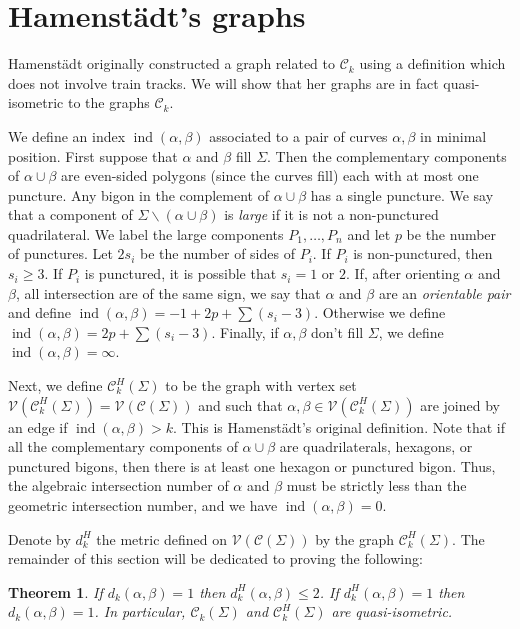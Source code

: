 \documentclass[11pt]{article}
\newtheorem{thm}{Theorem}[section]
\theoremstyle{remark}
\def\C{{\mathcal C}}
\def\ind{\operatorname{ind}}
\begin{document}
\section{Hamenst\"{a}dt's graphs}\label{sec:3}
Hamenst\"{a}dt originally constructed a graph related to $\C_k$ using a definition
which does not involve train tracks. We will show that her graphs are in fact
quasi-isometric to the graphs $\C_k$.

We define an index $\ind(\alpha,\beta)$ associated to a pair of curves $\alpha,\beta$
in minimal position.
First suppose that $\alpha$ and $\beta$ fill $\Sigma$. Then the complementary components of $\alpha\cup \beta$ are even-sided polygons (since the curves fill) each with at most one puncture.
Any bigon in the complement of $\alpha\cup\beta$ has a single puncture.
We say that a component of $\Sigma \smallsetminus (\alpha\cup\beta)$ is {\em large} if it is not a non-punctured quadrilateral.
 We label the large components $P_1, \dots, P_n$ and let $p$ be the number of punctures.
 Let $2s_i$ be the number of sides of $P_i$. If $P_i$ is non-punctured,
 then $s_i \ge 3$. If $P_i$ is punctured, it is possible that $s_i = 1$ or $2$.
If, after orienting $\alpha$ and $\beta$, all intersection are of the same sign,
we say that $\alpha$ and $\beta$ are an {\em orientable pair} and define
$\ind(\alpha, \beta) =-1+2p + \sum (s_i -3)$.
 Otherwise we define $\ind(\alpha, \beta) = 2p+\sum(s_i -3)$.
 Finally, if $\alpha,\beta$ don't fill $\Sigma$,
 we define $\ind(\alpha, \beta) = \infty$.

Next, we define $\C^H_k(\Sigma)$ to be the graph with vertex set
$\mathcal{V}(\C^H_k(\Sigma))=\mathcal{V}(\C(\Sigma))$ and such that $\alpha,\beta\in \mathcal{V}(\C^H_k(\Sigma))$
are joined by an edge if $\ind(\alpha, \beta) > k$.
This is Hamenst\"{a}dt's original definition. Note that if all the complementary
components of $\alpha\cup \beta$ are quadrilaterals, hexagons, or punctured bigons,
then there is at least one hexagon or punctured bigon.
Thus, the algebraic intersection number of $\alpha$ and $\beta$
must be strictly less than the geometric
intersection number, and we have $\ind(\alpha, \beta) = 0$.


Denote by $d_k^H$ the metric defined on $\mathcal V(\C(\Sigma))$ by the graph
$\C_k^H(\Sigma)$. The remainder of this section will be dedicated to proving the
following:
\begin{thm}\label{ursuladef}
If $d_k(\alpha, \beta) = 1$ then $d^H_k(\alpha,\beta) \le 2$.
If $d^H_k(\alpha, \beta) =1$ then $d_k(\alpha,\beta) =1$.
In particular, $\C_k(\Sigma)$ and $\C^H_k(\Sigma)$ are quasi-isometric.
\end{thm}
\end{document}
